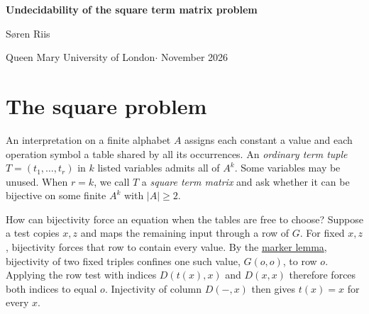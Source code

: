 \documentclass[a4paper,11pt]{article}
\begin{document}
\setlength{\abovedisplayskip}{6pt plus 2pt minus 2pt}
\setlength{\belowdisplayskip}{6pt plus 2pt minus 2pt}
\setlength{\abovedisplayshortskip}{3pt plus 1pt minus 1pt}
\setlength{\belowdisplayshortskip}{4pt plus 1pt minus 1pt}
\begin{center}
{\LARGE\bfseries Undecidability of the square term matrix problem\par}
\medskip
{\large S{\o}ren Riis\par}
{\small Queen Mary University of London\quad $\cdot$  November 2026\par}
\end{center}
\begin{abstract}
It is undecidable whether three terms in three variables can define a bijection on \(A^3\) for some finite \(A\) with \(|A|\ge2\), even with one constant and three binary symbols. A marker lemma lets us force a pointwise identity \(t(x)=x\) by bijectivity alone. When two fixed triples are bijective, the lemma confines a distinguished table value to one row. Any two rows required to be onto must then have the same index. For ordinary term tuples and each fixed \(d\ge3\), attaining at least \(n^d\) outputs for some alphabet size \(n\ge2\) is undecidable. Raising the threshold by one gives a polynomial-time decision problem.
\end{abstract}

\section{The square problem}
An interpretation on a finite alphabet \(A\) assigns each constant a value and each operation symbol a table shared by all its occurrences. An \emph{ordinary term tuple} \(T=(t_1,\ldots,t_r)\) in \(k\) listed variables admits all of \(A^k\). Some variables may be unused. When \(r=k\), we call \(T\) a \emph{square term matrix} and ask whether it can be bijective on some finite \(A^k\) with \(|A|\ge2\).

How can bijectivity force an equation when the tables are free to choose? Suppose a test copies \(x,z\) and maps the remaining input through a row of \(G\). For fixed \(x,z\), bijectivity forces that row to contain every value. By the \hyperref[lem:marker]{marker lemma}, bijectivity of two fixed triples confines one such value, \(G(o,o)\), to row \(o\). Applying the row test with indices \(D(t(x),x)\) and \(D(x,x)\) therefore forces both indices to equal \(o\). Injectivity of column \(D(-,x)\) then gives \(t(x)=x\) for every \(x\).
\end{document}
